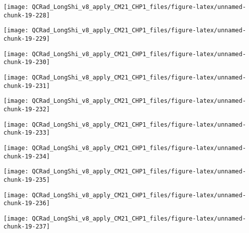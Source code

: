\documentclass[
  10pt,
  a4paper,oneside]{article}
\begin{document}
\begin{center}\texttt{[image: QCRad\_LongShi\_v8\_apply\_CM21\_CHP1\_files/figure-latex/unnamed-chunk-19-228]} \end{center}

\begin{center}\texttt{[image: QCRad\_LongShi\_v8\_apply\_CM21\_CHP1\_files/figure-latex/unnamed-chunk-19-229]} \end{center}

\begin{center}\texttt{[image: QCRad\_LongShi\_v8\_apply\_CM21\_CHP1\_files/figure-latex/unnamed-chunk-19-230]} \end{center}

\begin{center}\texttt{[image: QCRad\_LongShi\_v8\_apply\_CM21\_CHP1\_files/figure-latex/unnamed-chunk-19-231]} \end{center}

\begin{center}\texttt{[image: QCRad\_LongShi\_v8\_apply\_CM21\_CHP1\_files/figure-latex/unnamed-chunk-19-232]} \end{center}

\begin{center}\texttt{[image: QCRad\_LongShi\_v8\_apply\_CM21\_CHP1\_files/figure-latex/unnamed-chunk-19-233]} \end{center}

\begin{center}\texttt{[image: QCRad\_LongShi\_v8\_apply\_CM21\_CHP1\_files/figure-latex/unnamed-chunk-19-234]} \end{center}

\begin{center}\texttt{[image: QCRad\_LongShi\_v8\_apply\_CM21\_CHP1\_files/figure-latex/unnamed-chunk-19-235]} \end{center}

\begin{center}\texttt{[image: QCRad\_LongShi\_v8\_apply\_CM21\_CHP1\_files/figure-latex/unnamed-chunk-19-236]} \end{center}

\begin{center}\texttt{[image: QCRad\_LongShi\_v8\_apply\_CM21\_CHP1\_files/figure-latex/unnamed-chunk-19-237]} \end{center}
\end{document}
